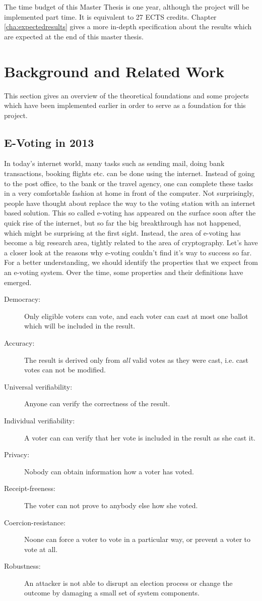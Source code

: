 \documentclass[numbers=noenddot, abstract=on, a4paper, headsepline,
footsepline, oneside, draft=off]{scrreprt}
\begin{document}
The time budget of this Master Thesis is one year, although the project will be
implemented part time. It is equivalent to 27 ECTS credits. Chapter
\vref{cha:expectedresults} gives a more in-depth specification about the results
which are expected at the end of this master thesis.

\chapter{Background and Related Work}
\label{cha:brw}
This section gives an overview of the theoretical foundations and some projects
which have been implemented earlier in order to serve as a foundation for this
project.

\section{E-Voting in 2013}
\label{sec:evoting}
In today's internet world, many tasks such as sending mail, doing bank
transactions, booking flights etc. can be done using the internet. Instead of
going to the post office, to the bank or the travel agency, one can complete
these tasks in a very comfortable fashion at home in front of the computer. Not
surprisingly, people have thought about replace the way to the voting station
with an internet based solution. This so called e-voting has appeared on the
surface soon after the quick rise of the internet, but so far the big
breakthrough has not happened, which might be surprising at the first sight.
Instead, the area of e-voting has become a big research area, tightly related to
the area of cryptography. Let's have a closer look at the reasons why e-voting
couldn't find it's way to success so far. For a better understanding, we should
identify the properties that we expect from an e-voting system. Over the time,
some properties and their definitions have emerged.

\begin{description}
  \item[Democracy:] Only eligible voters can vote, and each voter can
  cast at most one ballot which will be included in the result.
  \item[Accuracy:] The result is derived only from \emph{all} valid
  votes as they were cast, i.e. cast votes can not be modified.
  \item[Universal verifiability:] Anyone can verify the correctness of
  the result.
  \item[Individual verifiability:] A voter can can verify that her vote
  is included in the result as she cast it.
  \item[Privacy:] Nobody can obtain information how a voter has
  voted.
  \item[Receipt-freeness:] The voter can not prove to anybody else how
  she voted.
  \item[Coercion-resistance:] Noone can force a voter to vote in a
  particular way, or prevent a voter to vote at all.
  \item[Robustness:] An attacker is not able to disrupt an election
  process or change the outcome by damaging a small set of system components. 
\end{description}
\end{document}
